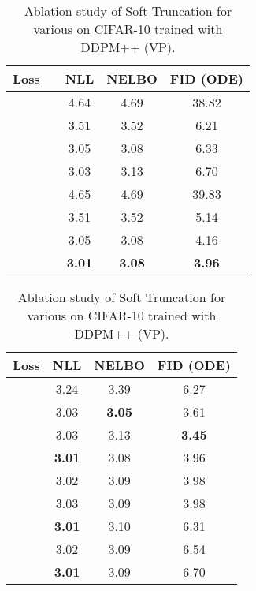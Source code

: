\documentclass[nohyperref]{article}
\theoremstyle{plain}
\theoremstyle{definition}
\theoremstyle{remark}
\begin{document}
\begin{table}[t]
\begin{minipage}[c]{0.5\textwidth}
\centering
	\caption{Ablation study of Soft Truncation for various  on CIFAR-10 with DDPM++ (VP).}
	\label{tab:ablation_epsilon}
	\vskip -0.05in
	\tiny
	\begin{tabular}{lcccc}
		\toprule
		Loss &  & NLL & NELBO & FID (ODE) \\\midrule
		\multirow{4}{*}{} &  & 4.64 & 4.69 & 38.82 \\
		&  & 3.51 & 3.52 & 6.21 \\
		&  & 3.05 & 3.08 & 6.33 \\
		&  & 3.03 & 3.13 & 6.70 \\\midrule
		\multirow{4}{*}{} &  & 4.65 & 4.69 & 39.83 \\
		&  & 3.51 & 3.52 & 5.14 \\
		&  & 3.05 & 3.08 & 4.16 \\
		&  & \textbf{3.01} & \textbf{3.08} & \textbf{3.96} \\
		\bottomrule
	\end{tabular}
	\end{minipage}

\begin{minipage}[c]{0.5\textwidth}
\vskip 0.1in
\centering
\caption{Ablation study of Soft Truncation for various  on CIFAR-10 trained with DDPM++ (VP).}
\label{tab:ablation_prior}
	\vskip -0.05in
\tiny
\begin{tabular}{lccc}
	\toprule
	Loss & NLL & NELBO & FID (ODE) \\\midrule
	 & 3.24 & 3.39 & 6.27 \\
	 & 3.03 & \textbf{3.05} & 3.61 \\
	 & 3.03 & 3.13 & \textbf{3.45} \\
	 & \textbf{3.01} & 3.08 & 3.96 \\
	 & 3.02 & 3.09 & 3.98 \\
	 & 3.03 & 3.09 & 3.98 \\
	 & \textbf{3.01} & 3.10 & 6.31 \\
	 & 3.02 & 3.09 & 6.54 \\\midrule
	 & \multirow{2}{*}{\textbf{3.01}} & \multirow{2}{*}{3.09} & \multirow{2}{*}{6.70} \\
	 &&&\\
	\bottomrule
\end{tabular}
\end{minipage}


\end{table}
\end{document}
